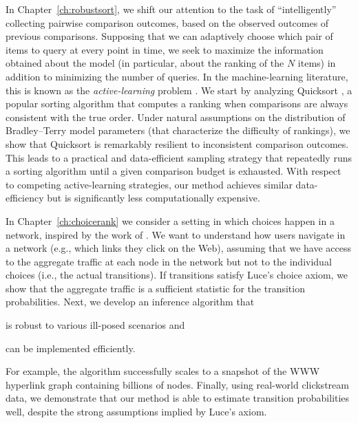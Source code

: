 In Chapter~\ref{ch:robustsort}, we shift our attention to the task of ``intelligently'' collecting pairwise comparison outcomes, based on the observed outcomes of previous comparisons.
Supposing that we can adaptively choose which pair of items to query at every point in time, we seek to maximize the information obtained about the model (in particular, about the ranking of the $N$ items) in addition to minimizing the number of queries.
In the machine-learning literature, this is known as the \emph{active-learning} problem \citep{settles2012active}.
We start by analyzing Quicksort \citep{hoare1962quicksort}, a popular sorting algorithm that computes a ranking when comparisons are always consistent with the true order.
Under natural assumptions on the distribution of Bradley--Terry model parameters (that characterize the difficulty of rankings), we show that Quicksort is remarkably resilient to inconsistent comparison outcomes.
This leads to a practical and data-efficient sampling strategy that repeatedly runs a sorting algorithm until a given comparison budget is exhausted.
With respect to competing active-learning strategies, our method achieves similar data-efficiency but is significantly less computationally expensive.

In Chapter~\ref{ch:choicerank} we consider a setting in which choices happen in a network, inspired by the work of \citet{kumar2015inverting}.
We want to understand how users navigate in a network (e.g., which links they click on the Web), assuming that we have access to the aggregate traffic at each node in the network but not to the individual choices (i.e., the actual transitions).
If transitions satisfy Luce's choice axiom, we show that the aggregate traffic is a sufficient statistic for the transition probabilities.
Next, we develop an inference algorithm that
\begin{enuminline}
\item is robust to various ill-posed scenarios and
\item can be implemented efficiently.
\end{enuminline}
For example, the algorithm successfully scales to a snapshot of the WWW hyperlink graph containing billions of nodes.
Finally, using real-world clickstream data, we demonstrate that our method is able to estimate transition probabilities well, despite the strong assumptions implied by Luce's axiom.

